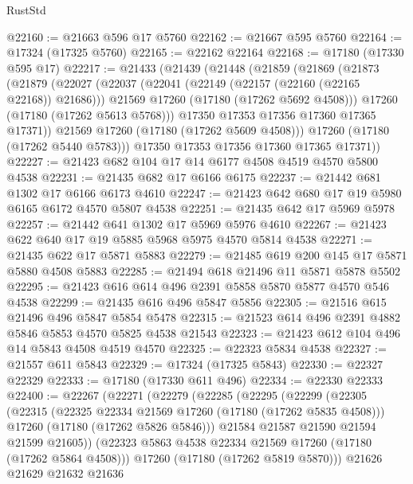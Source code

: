 \begin{lexlean}{RustStd}
\begin{coremodule}
@22160 := @21663 @596 @17 @5760
@22162 := @21667 @595 @5760
@22164 := @17324 (@17325 @5760)
@22165 := @22162 @22164
@22168 := @17180 (@17330 @595 @17)
@22217 := @21433
    (@21439
      (@21448
        (@21859
          (@21869
            (@21873
              (@21879
                (@22027
                  (@22037
                    (@22041 (@22149 (@22157 (@22160 (@22165 @22168)) @21686)))
                    @21569
                    @17260
                    (@17180 (@17262 @5692 @4508)))
                  @17260
                  (@17180 (@17262 @5613 @5768)))
                @17350
                @17353
                @17356
                @17360
                @17365
                @17371))
            @21569
            @17260
            (@17180 (@17262 @5609 @4508)))
          @17260
          (@17180 (@17262 @5440 @5783)))
        @17350
        @17353
        @17356
        @17360
        @17365
        @17371))
@22227 := @21423 @682 @104 @17 @14 @6177 @4508 @4519 @4570 @5800 @4538
@22231 := @21435 @682 @17 @6166 @6175
@22237 := @21442 @681 @1302 @17 @6166 @6173 @4610
@22247 := @21423 @642 @680 @17 @19 @5980 @6165 @6172 @4570 @5807 @4538
@22251 := @21435 @642 @17 @5969 @5978
@22257 := @21442 @641 @1302 @17 @5969 @5976 @4610
@22267 := @21423 @622 @640 @17 @19 @5885 @5968 @5975 @4570 @5814 @4538
@22271 := @21435 @622 @17 @5871 @5883
@22279 := @21485 @619 @200 @145 @17 @5871 @5880 @4508 @5883
@22285 := @21494 @618 @21496 @11 @5871 @5878 @5502
@22295 := @21423 @616 @614 @496 @2391 @5858 @5870 @5877 @4570 @546 @4538
@22299 := @21435 @616 @496 @5847 @5856
@22305 := @21516 @615 @21496 @496 @5847 @5854 @5478
@22315 := @21523 @614 @496 @2391 @4882 @5846 @5853 @4570 @5825 @4538 @21543
@22323 := @21423 @612 @104 @496 @14 @5843 @4508 @4519 @4570
@22325 := @22323 @5834 @4538
@22327 := @21557 @611 @5843
@22329 := @17324 (@17325 @5843)
@22330 := @22327 @22329
@22333 := @17180 (@17330 @611 @496)
@22334 := @22330 @22333
@22400 := @22267
    (@22271
      (@22279
        (@22285
          (@22295
            (@22299
              (@22305
                (@22315
                  (@22325 @22334 @21569 @17260 (@17180 (@17262 @5835 @4508)))
                  @17260
                  (@17180 (@17262 @5826 @5846)))
                @21584
                @21587
                @21590
                @21594
                @21599
                @21605))
            (@22323 @5863 @4538 @22334 @21569 @17260 (@17180 (@17262 @5864 @4508)))
            @17260
            (@17180 (@17262 @5819 @5870)))
          @21626
          @21629
          @21632
          @21636

\end{coremodule}
\end{lexlean}

